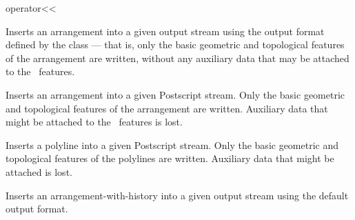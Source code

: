 \ccHtmlNoClassLinks
\begin{ccRefFunction}{operator<<}
\label{ref_arr_operator_leftshift}

\ccDefinition


Inserts an arrangement into a given output stream using the
output format defined by the  class --- that is,
only the basic geometric and topological features of the arrangement are
written, without any auxiliary data that may be attached to the
\dcel\ features.




Inserts an arrangement into a given Postscript stream.
Only the basic geometric and topological features of the arrangement are
written. Auxiliary data that might be attached to the \dcel\ features is
lost.




Inserts a polyline into a given Postscript stream.
Only the basic geometric and topological features of the polylines are
written. Auxiliary data that might be attached is lost.
    


Inserts an arrangement-with-history into a given
output stream using the default output format.



\ccSeeAlso
  \\
  \\

\end{ccRefFunction}
\ccRefPageEnd
